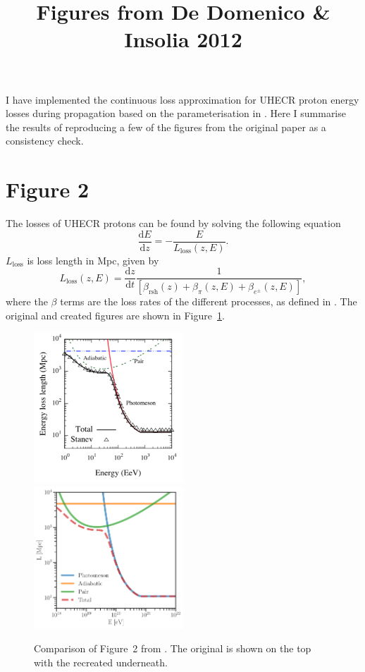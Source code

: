 \documentclass[fontsize=12pt]{article}
\title{\textbf{Figures from De Domenico \& Insolia 2012}}
\begin{document}
\maketitle
 
I have implemented the continuous loss approximation for UHECR proton energy losses during propagation based on the parameterisation in \cite{MD2012}. Here I summarise the results of reproducing a few of the figures from the original paper as a consistency check. 

\section*{Figure 2}

The losses of UHECR protons can be found by solving the following equation
\begin{equation}
\frac{\mathrm{d} E}{\mathrm{d} z} = - \frac{E}{L_\mathrm{loss}(z, E)}.
\end{equation}
$L_\mathrm{loss}$ is loss length in Mpc, given by
\begin{equation}
L_\mathrm{loss}(z, E) = \frac{\mathrm{d}z}{\mathrm{d}t} \frac{1}{\left[ \beta_\mathrm{rsh}(z) + \beta_\pi(z, E) + \beta_{e^{\pm}}(z, E) \right]},
\end{equation}
where the $\beta$ terms are the loss rates of the different processes, as defined in \cite{MD2012}. The original and created figures are shown in Figure~\ref{fig2comp}.

\begin{figure}
\centering
\includegraphics[width=0.5\textwidth]{figures/fig2_original.png}
\includegraphics[width=0.5\textwidth]{figures/Fig2_MD2012.pdf}
 \caption{Comparison of Figure~2 from \cite{MD2012}. The original is shown on the top with the recreated underneath.}
 \label{fig2comp}
\end{figure}
\end{document}

